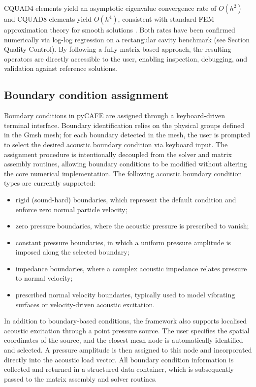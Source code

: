 \documentclass{jors}
\begin{document}
CQUAD4 elements yield an asymptotic eigenvalue convergence rate of $O(h^2)$ and CQUAD8 elements yield $O(h^4)$, consistent with standard FEM approximation theory for smooth solutions \cite{Ihlenburg1995,Babuska1988}. Both rates have been confirmed numerically via log-log regression on a rectangular cavity benchmark (see Section Quality Control). By following a fully matrix-based approach, the resulting operators are directly accessible to the user, enabling inspection, debugging, and validation against reference solutions.

\subsection*{Boundary condition assignment}
Boundary conditions in pyCAFE are assigned through a keyboard-driven terminal interface. Boundary identification relies on the physical groups defined in the Gmsh mesh; for each boundary detected in the mesh, the user is prompted to select the desired acoustic boundary condition via keyboard input. The assignment procedure is intentionally decoupled from the solver and matrix assembly routines, allowing boundary conditions to be modified without altering the core numerical implementation. The following acoustic boundary condition types are currently supported:
\begin{itemize}
    \item rigid (sound-hard) boundaries, which represent the default condition and enforce zero normal particle velocity;
    \item zero pressure boundaries, where the acoustic pressure is prescribed to vanish;
    \item constant pressure boundaries, in which a uniform pressure amplitude is imposed along the selected boundary;
    \item impedance boundaries, where a complex acoustic impedance relates pressure to normal velocity;
    \item prescribed normal velocity boundaries, typically used to model vibrating surfaces or velocity-driven acoustic excitation.
\end{itemize}
In addition to boundary-based conditions, the framework also supports localised acoustic excitation through a point pressure source. The user specifies the spatial coordinates of the source, and the closest mesh node is automatically identified and selected. A pressure amplitude is then assigned to this node and incorporated directly into the acoustic load vector. All boundary condition information is collected and returned in a structured data container, which is subsequently passed to the matrix assembly and solver routines.
\end{document}
